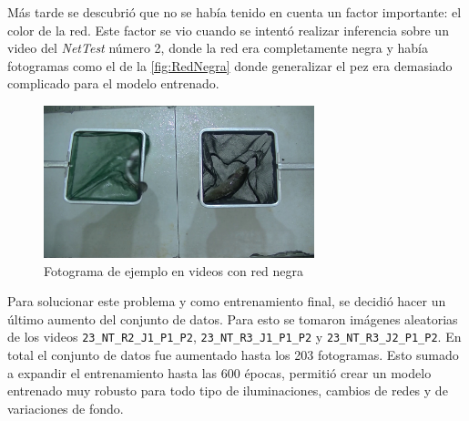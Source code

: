 Más tarde se descubrió que no se había tenido en cuenta un factor importante: el color de la red. Este factor se vio cuando se intentó realizar inferencia sobre un video del \textit{NetTest} número 2, donde 
la red era completamente negra y había fotogramas como el de la \autoref{fig:RedNegra} donde generalizar el pez era demasiado complicado para el modelo entrenado.

\begin{figure}[H]
    \centering
    \includegraphics[width=0.7\textwidth]{images/6/6.3/RedNegra.jpg}
    \caption{Fotograma de ejemplo en videos con red negra}
    \label{fig:RedNegra}
\end{figure}

Para solucionar este problema y como entrenamiento final, se decidió hacer un último aumento del conjunto de datos. Para esto se tomaron imágenes aleatorias de los videos \verb|23_NT_R2_J1_P1_P2|, 
\verb|23_NT_R3_J1_P1_P2| y \verb|23_NT_R3_J2_P1_P2|. En total el conjunto de datos fue aumentado hasta los 203 fotogramas.\newline
Esto sumado a expandir el entrenamiento hasta las 600 épocas, permitió crear un modelo entrenado muy robusto para todo tipo de iluminaciones, cambios de redes y de variaciones de fondo.



\clearpage

